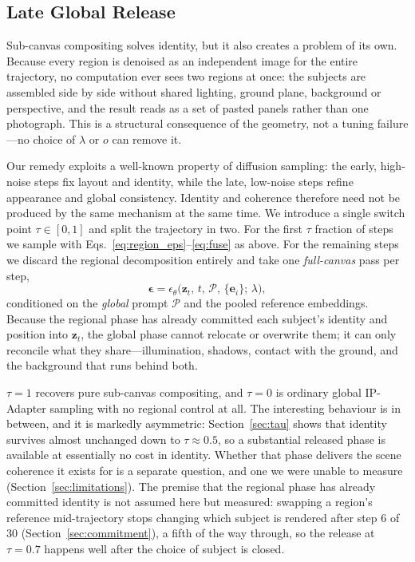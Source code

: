 \documentclass[10pt,twocolumn,letterpaper]{article}
\begin{document}
\subsection{Late Global Release}
\label{sec:late_release}

Sub-canvas compositing solves identity, but it also creates a problem of
its own.  Because every region is denoised as an independent image for
the entire trajectory, no computation ever sees two regions at once: the
subjects are assembled side by side without shared lighting, ground
plane, background or perspective, and the result reads as a set of
pasted panels rather than one photograph.  This is a structural
consequence of the geometry, not a tuning failure---no choice of
$\lambda$ or $o$ can remove it.

Our remedy exploits a well-known property of diffusion sampling: the
early, high-noise steps fix layout and identity, while the late,
low-noise steps refine appearance and global consistency.  Identity and
coherence therefore need not be produced by the same mechanism at the
same time.  We introduce a single switch point $\tau\in[0,1]$ and split
the trajectory in two.  For the first $\tau$ fraction of steps we sample
with Eqs.~\ref{eq:region_eps}--\ref{eq:fuse} as above.  For the
remaining steps we discard the regional decomposition entirely and take
one \emph{full-canvas} pass per step,
\begin{equation}
  \boldsymbol{\epsilon} =
    \epsilon_\theta\!\bigl(\mathbf{z}_t,\,t,\,\mathcal{P},\,
    \{\mathbf{e}_i\};\,\lambda\bigr),
  \label{eq:release}
\end{equation}
conditioned on the \emph{global} prompt $\mathcal{P}$ and the pooled
reference embeddings.  Because the regional phase has already committed
each subject's identity and position into $\mathbf{z}_t$, the global
phase cannot relocate or overwrite them; it can only reconcile what they
share---illumination, shadows, contact with the ground, and the
background that runs behind both.

$\tau{=}1$ recovers pure sub-canvas compositing, and $\tau{=}0$ is
ordinary global IP-Adapter sampling with no regional control at all.
The interesting behaviour is in between, and it is markedly asymmetric:
Section~\ref{sec:tau} shows that identity survives almost unchanged down to
$\tau\!\approx\!0.5$, so a substantial released phase is available at
essentially no cost in identity.  Whether that phase delivers the scene
coherence it exists for is a separate question, and one we were unable to
measure (Section~\ref{sec:limitations}).
The premise that the regional phase has already committed identity is not
assumed here but measured: swapping a region's reference mid-trajectory stops
changing which subject is rendered after step 6 of 30
(Section~\ref{sec:commitment}), a fifth of the way through, so the release at
$\tau{=}0.7$ happens well after the choice of subject is closed.
\end{document}
